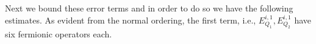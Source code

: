 \documentclass[sn-mathphys, Numbered ,a4paper]{sn-jnl}%
\DeclareMathOperator{\Z}{\mathbb{Z}}
\theoremstyle{plain}
\theoremstyle{definition}
\theoremstyle{remark}
\theoremstyle{plain}
\theoremstyle{definition}
\theoremstyle{remark}
\begin{document}
\begin{comment}
		&+ 2\delta_{-s_1,q}\delta_{s-\ell,s_1-\ell_1}a^*_{q-\ell+\ell_1}a_{-s} + 2\delta_{-s,q-\ell+\ell_1}b^*_{-s_1}(-\ell_1)a_{-s+\ell}a_{q} \nonumber\\
		&-2\delta_{-s,q-\ell+\ell_1}\delta_{-s+\ell,-s_1+\ell_1}a^*_{-s_1}a_{q} + \delta_{-s_1,q}\delta_{-s,q-\ell+\ell_1}a^*_{-s_1+\ell_1}a_{-s+\ell} \nonumber\\
		&+ \big\{ [b_{-s}(-\ell),a^*_{q-\ell+\ell_1}],[a^*_{q}, b_{-s_1}(-\ell_1)]^*\big\} \Big)
	\end{aligned}\nonumber\\
	&+\mathrm{h.c.} + (q\rightarrow-q)\nonumber\\
	&-\sum\limits_{\ell \in \Z^3_*}\sum\limits_{r,s \in L_{\ell}}\Theta^{m+1}_K(P^q)_{r,s}\epsilon_{r,s}(\ell,\ell)
	\equalscolon \sum\limits_{i=1}^{6}\sum\limits_{j=1}^{8} E_{Q_2}^{\,i,j}\nonumber + E_{Q_2}^{\, 7}.
\end{alignat}

with all the terms $E_{Q_1}^{i,j}, E_{Q_2}^{i,j}$ and $E_{Q_2}^{7}$ having the contributions from both $q$ and $-q$ momenta. The first index $i$ refers to the momentum $r,s,s_1$ being summed over different sets and the second index $j$ refers to the different terms within, i.e., 2 terms for every $i\mathrm{th}$ sum in $E_{Q_1}$ and 8 terms for every $i\mathrm{th}$ sum in $E_{Q_2}$. These terms either have six, four, two or no fermionic operator.
\end{comment}


 Next we bound these error terms and in order to do so we have the following estimates. As evident from the normal ordering, the first term, i.e.,  $E_{Q_1}^{i,1}, E_{Q_2}^{i,1}$ have six fermionic operators each. %
\end{document}
